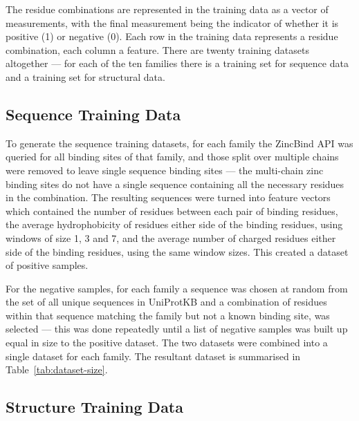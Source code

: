 The residue combinations are represented in the training data as a vector of measurements, with the final measurement being the indicator of whether it is positive (1) or negative (0). Each row in the training data represents a residue combination, each column a feature. There are twenty training datasets altogether --- for each of the ten families there is a training set for sequence data and a training set for structural data.

\subsection{Sequence Training Data}

To generate the sequence training datasets, for each family the ZincBind API was queried for all binding sites of that family, and those split over multiple chains were removed to leave single sequence binding sites --- the multi-chain zinc binding sites do not have a single sequence containing all the necessary residues in the combination. The resulting sequences were turned into feature vectors which contained the number of residues between each pair of binding residues, the average hydrophobicity of residues either side of the binding residues, using windows of size 1, 3 and 7, and the average number of charged residues either side of the binding residues, using the same window sizes. This created a dataset of positive samples.

For the negative samples, for each family a sequence was chosen at random from the set of all unique sequences in UniProtKB and a combination of residues within that sequence matching the family but not a known binding site, was selected --- this was done repeatedly until a list of negative samples was built up equal in size to the
positive dataset.  The two datasets were combined into a single dataset for each family. The resultant dataset is summarised in Table~\ref{tab:dataset-size}.

\subsection{Structure Training Data}

